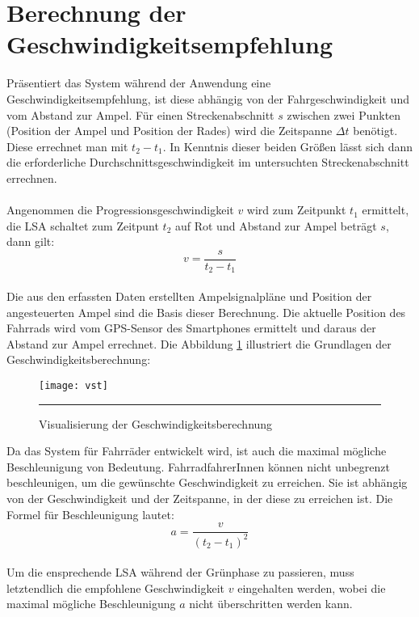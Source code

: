 \section{\label{sec:mathGrundlagen}Berechnung der Geschwindigkeitsempfehlung}
Präsentiert das System während der Anwendung eine Geschwindigkeitsempfehlung, ist diese abhängig von der Fahrgeschwindigkeit und vom Abstand zur Ampel. Für einen Streckenabschnitt $s$ zwischen zwei Punkten (Position der Ampel und Position der Rades) wird die Zeitspanne $\Delta t$ benötigt. Diese errechnet man mit $t_{2} - t_{1}$. In Kenntnis dieser beiden Größen lässt sich dann die erforderliche Durchschnittsgeschwindigkeit im untersuchten Streckenabschnitt errechnen.\\\\ 
Angenommen die Progressionsgeschwindigkeit $v$ wird zum Zeitpunkt $t_{1}$ ermittelt, die \gls {LSA} schaltet zum Zeitpunt $t_{2}$ auf Rot und Abstand zur Ampel beträgt $s$, dann gilt: \\
\[ v = \frac{s}{t_{2} - t_{1}} \] \\
Die aus den erfassten Daten erstellten Ampelsignalpläne und Position der angesteuerten Ampel sind die Basis dieser Berechnung. Die aktuelle Position des Fahrrads wird vom \gls{GPS}-Sensor des \glspl{Smartphone} ermittelt und daraus der Abstand zur Ampel errechnet. Die Abbildung \ref{fig:vst} illustriert die Grundlagen der Geschwindigkeitsberechnung: \\
\begin{figure}[H]  
    \centering  
    \texttt{[image: vst]}  
    \rule{35em}{0.5pt}   
    \caption[Berechnung Progressionsgeschwindigkeit]{Visualisierung der Geschwindigkeitsberechnung}
    \label{fig:vst}
\end{figure}
\clearpage
Da das System für Fahrräder entwickelt wird, ist auch die maximal mögliche Beschleunigung von Bedeutung. FahrradfahrerInnen können nicht unbegrenzt beschleunigen, um die gewünschte Geschwindigkeit zu erreichen. Sie ist abhängig von der Geschwindigkeit und der Zeitspanne, in der diese zu erreichen ist. Die Formel für Beschleunigung lautet:
\[ a = \frac{v}{(t_{2} - t_{1})^{2}} \]\\
 Um die ensprechende \gls{LSA} während der Grünphase zu passieren, muss letztendlich die empfohlene Geschwindigkeit $v$ eingehalten werden, wobei die maximal mögliche Beschleunigung $a$ nicht überschritten werden kann.
